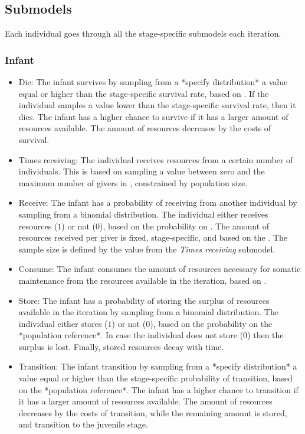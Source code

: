 \documentclass{article}
\begin{document}
\subsection{Submodels}

Each individual goes through all the stage-specific submodels each iteration.

\subsubsection{Infant}

\begin{itemize}
    \item Die: The infant survives by sampling from a *specify distribution* a value equal or higher than the stage-specific survival rate, based on \cite{gurven2007longevity}. If the individual samples a value lower than the stage-specific survival rate, then it dies. The infant has a higher chance to survive if it has a larger amount of resources available. The amount of resources decreases by the costs of survival.
    \item Times receiving: The individual receives resources from a certain number of individuals. This is based on sampling a value between zero and the maximum number of givers in \cite{gurven2004give}, constrained by population size.
    \item Receive: The infant has a probability of receiving from another individual by sampling from a binomial distribution. The individual either receives resources ($1$) or not ($0$), based on the probability on \cite{gurven2004give}. The amount of resources received per giver is fixed, stage-specific, and based on the \cite{gurven2004give}. The sample size is defined by the value from the \emph{Times receiving} submodel. 
    \item Consume: The infant consumes the amount of resources necessary for somatic maintenance from the resources available in the iteration, based on \cite{kaplan2000theory}.
    \item Store: The infant has a probability of storing the surplus of resources available in the iteration by sampling from a binomial distribution. The individual either stores ($1$) or not ($0$), based on the probability on the *population reference*. In case the individual does not store ($0$) then the surplus is lost. Finally, stored resources decay with time.
    \item Transition: The infant transition by sampling from a *specify distribution* a value equal or higher than the stage-specific probability of transition, based on the *population reference*. The infant has a higher chance to transition if it has a larger amount of resources available. The amount of resources decreases by the costs of transition, while the remaining amount is stored, and transition to the juvenile stage.
\end{itemize}
\end{document}
